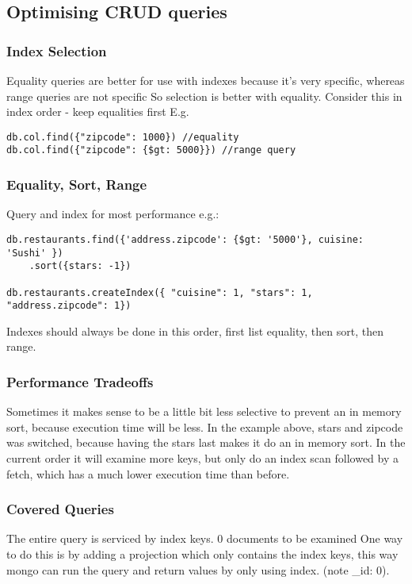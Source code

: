 \documentclass[11pt]{article}
\begin{document}
\subsection{Optimising CRUD queries}
\label{sec:orgdab4444}

\subsubsection{Index Selection}
\label{sec:orgc02fae6}
Equality queries are better for use with indexes because it's very specific, whereas range queries are not specific
So selection is better with equality. Consider this in index order - keep equalities first
E.g.
\begin{verbatim}
db.col.find({"zipcode": 1000}) //equality
db.col.find({"zipcode": {$gt: 5000}}) //range query
\end{verbatim}


\subsubsection{Equality, Sort, Range}
\label{sec:orgede5241}
Query and index for most performance e.g.:
\begin{verbatim}
db.restaurants.find({'address.zipcode': {$gt: '5000'}, cuisine: 'Sushi' })
    .sort({stars: -1})

db.restaurants.createIndex({ "cuisine": 1, "stars": 1, "address.zipcode": 1})
\end{verbatim}

Indexes should always be done in this order, first list equality, then sort, then range.


\subsubsection{Performance Tradeoffs}
\label{sec:org9bd6cbc}
Sometimes it makes sense to be a little bit less selective to prevent an in memory sort, because execution time will be less.
In the example above, stars and zipcode was switched, because having the stars last makes it do an in memory sort.
In the current order it will examine more keys, but only do an index scan followed by a fetch, which has a much lower execution time than before.

\subsubsection{Covered Queries}
\label{sec:org54d85df}
The entire query is serviced by index keys. 0 documents to be examined
One way to do this is by adding a projection which only contains the index keys, this way mongo can run the query and return values by only using index. (note \_id: 0). 
\end{document}
